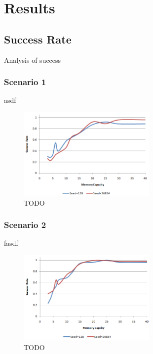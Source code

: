 \chapter{Results}

\section{Success Rate}

Analysis of success

\subsection{Scenario 1}

asdf

\begin{figure}[h]
    \begin{center}
    \includegraphics[width=0.6\textwidth]{images/result_sccess_sim1byseed_dss}
    \caption{TODO}
    \end{center}
\end{figure}

\subsection{Scenario 2}

fasdf

\begin{figure}[ht]
    \centering
    \includegraphics[width=0.6\textwidth]{images/result_sccess_sim2byseed_dss}
    \caption{TODO}
\end{figure}

